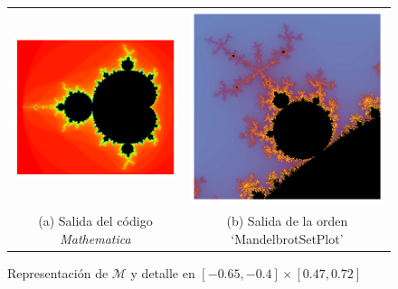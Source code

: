 \begin{figure}[ht]
  \centering
  \begin{tabular}{cc}
    \includegraphics[scale=0.432]{./img/C3/Mandelbrot-Mathematica.png} &   \includegraphics[scale=0.368]{./img/C3/MandelbrotSetPlot.png} \\
  (a) Salida del código \textit{Mathematica}  & (b) Salida de la orden `MandelbrotSetPlot' \\[6pt]
  \end{tabular}
  \caption{Representación de $\mathcal{M}$ y detalle en $[-0.65, -0.4]\times[0.47, 0.72]$}
  \label{fig:Mandelbrot-explicado}
\end{figure}

